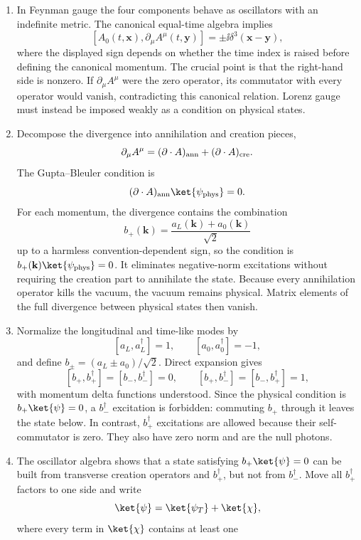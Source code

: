\begin{enumerate}
\begin{enumerate}
\item
In Feynman gauge the four components behave as oscillators with an
indefinite metric.  The canonical equal-time algebra implies
\[
 [A_0(t,\mathbf x),\partial_\mu A^\mu(t,\mathbf y)]
 =\pm \ii\delta^3(\mathbf x-\mathbf y),
\]
where the displayed sign depends on whether the time index is raised before
defining the canonical momentum.  The crucial point is that the right-hand
side is nonzero.  If \(\partial_\mu A^\mu\) were the zero operator, its
commutator with every operator would vanish, contradicting this canonical
relation.  Lorenz gauge must instead be imposed weakly as a condition on
physical states.
\item
Decompose the divergence into annihilation and creation pieces,
\[
 \partial_\mu A^\mu
 =(\partial\cdot A)_{\rm ann}+(\partial\cdot A)_{\rm cre}.
\]
The Gupta--Bleuler condition is
\[
 (\partial\cdot A)_{\rm ann}\ket{\psi_{\rm phys}}=0.
\]
For each momentum, the divergence contains the combination
\[
 b_+(\mathbf k)=\frac{a_L(\mathbf k)+a_0(\mathbf k)}{\sqrt2}
\]
up to a harmless convention-dependent sign, so the condition is
\(b_+(\mathbf k)\ket{\psi_{\rm phys}}=0\).  It eliminates negative-norm
excitations without requiring the creation part to annihilate the state.
Because every annihilation operator kills the vacuum, the vacuum remains
physical.  Matrix elements of the full divergence between physical states
then vanish.
\item
Normalize the longitudinal and time-like modes by
\[
 [a_L,a_L^\dagger]=1,\qquad [a_0,a_0^\dagger]=-1,
\]
and define \(b_\pm=(a_L\pm a_0)/\sqrt2\).  Direct expansion gives
\[
 [b_+,b_+^\dagger]=[b_-,b_-^\dagger]=0,\qquad
 [b_+,b_-^\dagger]=[b_-,b_+^\dagger]=1,
\]
with momentum delta functions understood.  Since the physical condition is
\(b_+\ket{\psi}=0\), a \(b_-^\dagger\) excitation is forbidden:
commuting \(b_+\) through it leaves the state below.  In contrast,
\(b_+^\dagger\) excitations are allowed because their self-commutator is
zero.  They also have zero norm and are the null photons.
\item
The oscillator algebra shows that a state satisfying
\(b_+\ket{\psi}=0\) can be built from transverse creation operators and
\(b_+^\dagger\), but not from \(b_-^\dagger\).  Move all
\(b_+^\dagger\) factors to one side and write
\[
 \ket{\psi}=\ket{\psi_T}+\ket{\chi},
\]
where every term in \(\ket{\chi}\) contains at least one

\end{enumerate}
\end{enumerate}
